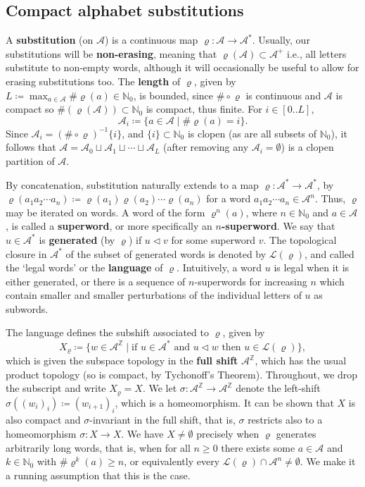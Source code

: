 \documentclass[11pt]{amsart}
\numberwithin{equation}{section}
\theoremstyle{plain}
\theoremstyle{definition}
\newcommand{\Z}{{\mathbb Z}}
\newcommand{\N}{{\mathbb N}}
\newcommand{\mc}{\mathcal}
\newcommand{\A}{\mc A}
\newcommand{\sub}{\varrho}
\newcommand{\lang}{\mathcal{L}}
\begin{document}
\subsection{Compact alphabet substitutions}
A \textbf{substitution} (on \(\A\)) is a continuous map \(\sub \colon \A \to \A^\ast\). Usually, our substitutions will be \textbf{non-erasing}, meaning that \(\sub(\A) \subset \A^+\) i.e., all letters substitute to non-empty words, although it will occasionally be useful to allow for erasing substitutions too. The \textbf{length} of \(\sub\), given by \(L \coloneqq \max_{a \in \A} \# \sub(a) \in \N_0\), is bounded, since \(\# \circ \sub\) is continuous and \(\A\) is compact so \(\#(\sub(\A)) \subset \N_0\) is compact, thus finite. For \(i \in [0..L]\),
\[
\A_i \coloneqq \{ a \in \A \mid \# \sub(a) = i \} .
\]
Since \(\A_i = (\# \circ \sub)^{-1} \{i\}\), and \(\{i\} \subset \N_0\) is clopen (as are all subsets of \(\N_0\)), it follows that \(\A = \A_0 \sqcup \A_1 \sqcup \cdots \sqcup \A_L\) (after removing any \(\A_i = \emptyset\)) is a clopen partition of \(\A\).

By concatenation, substitution naturally extends to a map \(\sub \colon \A^\ast \to \A^\ast\), by \(\sub(a_1 a_2 \cdots a_n) \coloneqq \sub(a_1) \sub(a_2) \cdots \sub(a_n)\) for a word \(a_1 a_2 \cdots a_n \in \A^n\). Thus, \(\sub\) may be iterated on words. A word of the form \(\sub^n(a)\), where \(n \in \N_0\) and \(a \in \A\), is called a \textbf{superword}, or more specifically an \textbf{\(n\)-superword}. We say that \(u \in \A^\ast\) is \textbf{generated} (by \(\sub\)) if \(u \triangleleft v\) for some superword \(v\). The topological closure in \(\A^\ast\) of the subset of generated words is denoted by \(\lang(\sub)\), and called the `legal words' or the \textbf{language} of \(\sub\). Intuitively, a word \(u\) is legal when it is either generated, or there is a sequence of \(n\)-superwords for increasing \(n\) which contain smaller and smaller perturbations of the individual letters of \(u\) as subwords.

The language defines the subshift associated to \(\sub\), given by
\[
X_{\sub} \coloneqq \{ w \in \A^\Z \mid \text{if } u \in \A^\ast \text{ and } u \triangleleft w \text{ then } u \in \lang(\sub)\} ,
\]
which is given the subspace topology in the \textbf{full shift} \(\A^\Z\), which has the usual product topology (so is compact, by Tychonoff's Theorem). Throughout, we drop the subscript and write \(X_{\sub} = X\). We let \(\sigma \colon \A^\Z \to \A^\Z\) denote the left-shift \(\sigma((w_i)_i) \coloneqq (w_{i+1})_i\), which is a homeomorphism. It can be shown that \(X\) is also compact and \(\sigma\)-invariant in the full shift, that is, \(\sigma\) restricts also to a homeomorphism \(\sigma \colon X \to X\). We have \(X \neq \emptyset\) precisely when \(\sub\) generates arbitrarily long words, that is, when for all \(n \geq 0\) there exists some \(a \in \A\) and \(k \in \N_0\) with \(\# \sub^k(a) \geq n\), or equivalently every \(\lang(\sub) \cap \A^n \neq \emptyset\). We make it a running assumption that this is the case.
\end{document}
